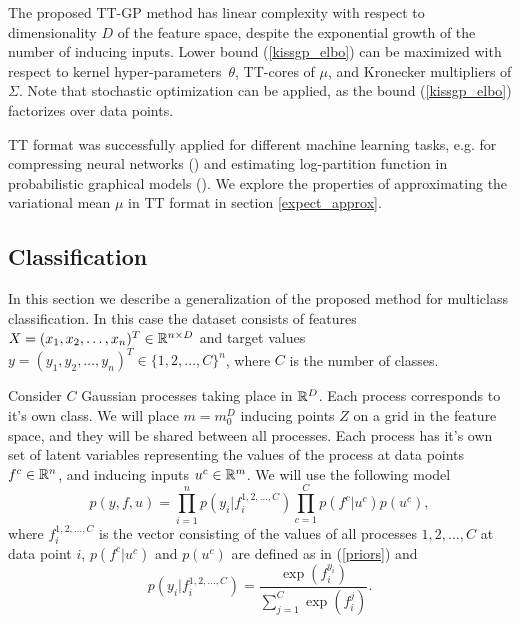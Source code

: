   The proposed TT-GP method has linear complexity with respect to dimensionality
  $D$ of the feature space, despite the exponential growth of the number of
  inducing inputs. Lower bound  (\ref{kissgp_elbo})
  can be maximized with respect to kernel hyper-parameters~$\theta$, TT-cores
  of $\mu$, and Kronecker multipliers of $\Sigma$. Note that stochastic optimization
  can be applied, as the bound (\ref{kissgp_elbo}) factorizes over data points.
  
  TT format was successfully applied for different machine learning tasks, 
  e.g. for compressing neural networks (\citet{novikov2015}) and
  estimating log-partition function in probabilistic graphical models 
  (\citet{novikov2014}). We explore the properties of approximating the 
  variational mean $\mu$ in TT format in section \ref{expect_approx}.



  \subsection{Classification}

  In this section we describe a generalization of the proposed method for
  multiclass classification. In this case the dataset consists of features
  $X = (x_1, x_2, \ldots, x_n)^T \in \mathbb{R}^{n \times D}$ and target values
  $y = (y_1, y_2, \ldots, y_n)^T \in \{1, 2, \ldots, C\}^n$, where $C$ is the
  number of classes.

  Consider $C$ Gaussian processes taking place in $\mathbb{R}^D$. Each process
  corresponds to it's own class. We will place $m = m_0^D$ inducing points $Z$ on a grid
  in the feature space, and they will be shared between all processes. Each
  process has it's own set of latent variables representing the values of
  the process at data points $f^c \in \mathbb{R}^n$, and inducing inputs $u^c \in \mathbb{R}^m$.
  We will use the following model
  \[
    p(y, f, u) = \prod_{i=1}^n p\left(y_i | f_i^{1, 2, \ldots, C}\right)
      \prod_{c=1}^C p\left(f^c | u^c\right) p(u^c),
  \]
  where $f_i^{1,2,\ldots,C}$ is the vector consisting of the values of all processes
  $1, 2, \ldots, C$ at data point $i$, $p(f^c | u^c)$ and $p(u^c)$ are defined 
  as in (\ref{priors}) and 
  \[
    p(y_i | f_i^{1,2, \ldots, C}) = 
    \frac {\exp(f_i^{y_i})} {\sum_{j=1}^C\exp(f_i^j)}.
  \]
  
